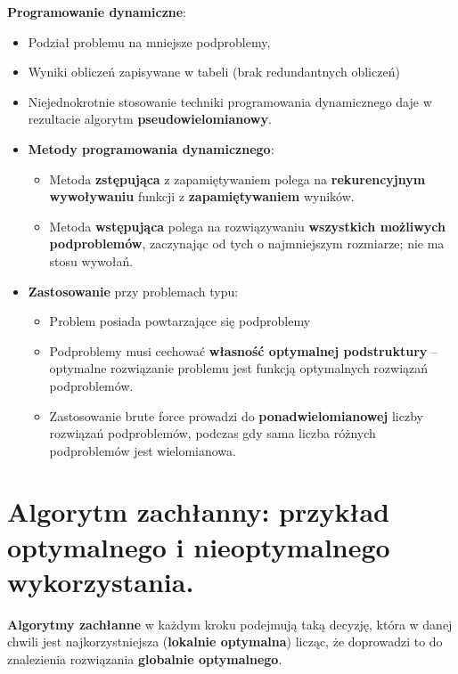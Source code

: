 \documentclass[main.tex]{subfiles}
\begin{document}
    \textbf{Programowanie dynamiczne}:
    \begin{itemize}[noitemsep]
        \item Podział problemu na mniejsze podproblemy,
        \item Wyniki obliczeń zapisywane w tabeli (brak redundantnych obliczeń)
        \item Niejednokrotnie stosowanie techniki programowania dynamicznego daje w rezultacie algorytm
        \textbf{pseudowielomianowy}.
        \item \textbf{Metody programowania dynamicznego}:
        \begin{itemize}
            \item Metoda \textbf{zstępująca} z zapamiętywaniem polega na \textbf{rekurencyjnym wywoływaniu} funkcji z
            \textbf{zapamiętywaniem} wyników.
            \item Metoda \textbf{wstępująca} polega na rozwiązywaniu \textbf{wszystkich możliwych podproblemów},
            zaczynając od tych o najmniejszym rozmiarze; nie ma stosu wywołań.
        \end{itemize}
        \item \textbf{Zastosowanie} przy problemach typu:
        \begin{itemize}[noitemsep]
            \item Problem posiada powtarzające się podproblemy
            \item Podproblemy musi cechować \textbf{własność optymalnej podstruktury} -- optymalne rozwiązanie problemu
            jest funkcją optymalnych rozwiązań podproblemów.
            \item Zastosowanie brute force prowadzi do \textbf{ponadwielomianowej} liczby rozwiązań podproblemów,
            podczas gdy sama liczba różnych podproblemów jest wielomianowa.
        \end{itemize}
    \end{itemize}


    \section{Algorytm zachłanny: przykład optymalnego i nieoptymalnego wykorzystania.}

    \textbf{Algorytmy zachłanne} w każdym kroku podejmują taką decyzję, która w danej chwili jest najkorzystniejsza
    (\textbf{lokalnie optymalna}) licząc, że doprowadzi to do znalezienia rozwiązania \textbf{globalnie optymalnego}.
\end{document}
